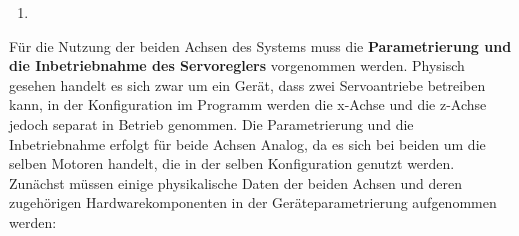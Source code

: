 \documentclass[../../../Bachelorarbeit.tex]{subfiles}
\begin{document}
\begin{itemize}
\begin{enumerate}
\begin{minipage}[t]{\linewidth}
{            }
            \label{fig:my-img32}
        \end{minipage}
        \item \begin{minipage}[t]{\linewidth}
            \raggedright
            \label{fig:my-img32}
        \end{minipage}
    \end{enumerate}
\end{itemize}

Für die Nutzung der beiden Achsen des Systems muss die \textbf{Parametrierung und die Inbetriebnahme des Servoreglers} vorgenommen werden. Physisch gesehen handelt es sich zwar um ein Gerät, dass zwei Servoantriebe betreiben kann, in der Konfiguration im Programm werden die x-Achse und die z-Achse jedoch separat in Betrieb genommen. Die Parametrierung und die Inbetriebnahme erfolgt für beide Achsen Analog, da es sich bei beiden um die selben Motoren handelt, die in der selben Konfiguration genutzt werden.\\
Zunächst müssen einige physikalische Daten der beiden Achsen und deren zugehörigen Hardwarekomponenten in der Geräteparametrierung aufgenommen werden:
\end{document}
